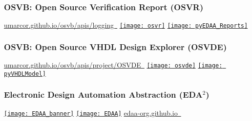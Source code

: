 \documentclass[xcolor={usenames,dvipsnames,svgnames}]{beamer}
\begin{document}
\begin{frame}
\frametitle{OSVB: Open Source Verification Report (OSVR)}
\centering
\Large \href{https://umarcor.github.io/osvb/apis/logging.html}{umarcor.github.io/osvb/apis/logging~\faBook}
\vfill
\hspace*{1.5cm}
\href{https://umarcor.github.io/osvb/apis/logging.html}{\texttt{[image: osvr]}}
\vfill
\Large \href{https://edaa-org.github.io/pyEDAA.Reports/}{\texttt{[image: pyEDAA\_Reports]}}
\end{frame}

\begin{frame}
\frametitle{OSVB: Open Source VHDL Design Explorer (OSVDE)}
\centering
\Large \href{https://umarcor.github.io/osvb/apis/project/OSVDE.html}{umarcor.github.io/osvb/apis/project/OSVDE~\faBook}
\vfill
\href{https://umarcor.github.io/osvb/apis/project/OSVDE.html}{\texttt{[image: osvde]}}
\vfill
\Large \href{https://vhdl.github.io/pyVHDLModel/}{\texttt{[image: pyVHDLModel]}}
\end{frame}

\begin{frame}
\frametitle{Electronic Design Automation Abstraction (EDA$^2$)}
\centering
\href{https://github.com/edaa-org}{\texttt{[image: EDAA\_banner]}}
\vfill
\href{https://edaa-org.github.io}{\texttt{[image: EDAA]}}
\vfill
\Large \href{https://edaa-org.github.io}{edaa-org.github.io~\faBook}
\end{frame}
\end{document}
